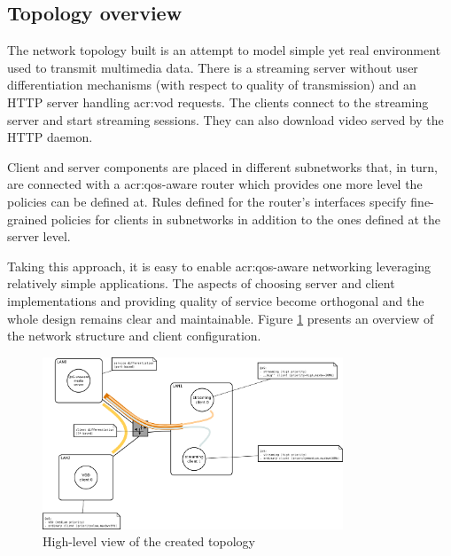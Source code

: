 \documentclass[11pt]{book}
\begin{document}
      \subsection{Topology overview}

        The network topology built is an attempt to model simple yet real environment used to transmit multimedia data.
        There is a streaming server without user differentiation mechanisms (with respect to quality of transmission)
        and an HTTP server handling \gls{acr:vod} requests. The clients connect to the streaming server and start streaming
        sessions. They can also download video served by the HTTP daemon.

        Client and server components are placed in different subnetworks that, in turn, are connected with a \gls{acr:qos}-aware
        router which provides one more level the policies can be defined at. Rules defined for the router's interfaces
        specify fine-grained policies for clients in subnetworks in addition to the ones defined at the server level.

        Taking this approach, it is easy to enable \gls{acr:qos}-aware networking leveraging relatively simple applications. The
        aspects of choosing server and client implementations and providing quality of service become orthogonal and the
        whole design remains clear and maintainable. Figure \ref{fig:cs:scenario} presents an overview of the network
        structure and client configuration.
      
        \begin{figure}[H]
          \begin{center}
            \includegraphics[width=0.8\textwidth]{img/test-case/diagram.pdf}
          \end{center}

          \caption{High-level view of the created topology}
          \label{fig:cs:scenario}
        \end{figure}
      
\end{document}
